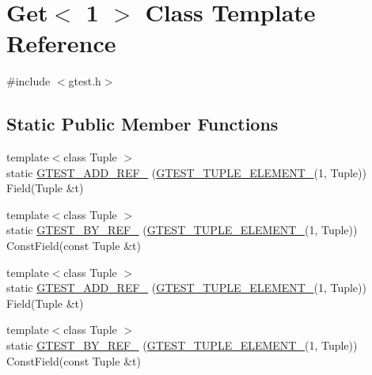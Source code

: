 \hypertarget{classstd_1_1tr1_1_1gtest__internal_1_1Get_3_011_01_4}{\section{\-Get$<$ 1 $>$ \-Class \-Template \-Reference}
\label{dd/d24/classstd_1_1tr1_1_1gtest__internal_1_1Get_3_011_01_4}
}


{\ttfamily \#include $<$gtest.\-h$>$}

\subsection*{\-Static \-Public \-Member \-Functions}
\begin{DoxyCompactItemize}
\item 
{\footnotesize template$<$class Tuple $>$ }\\static \hyperlink{classstd_1_1tr1_1_1gtest__internal_1_1Get_3_011_01_4_a3ad2995f1b852dbd9fde5033ddd07c09}{\-G\-T\-E\-S\-T\-\_\-\-A\-D\-D\-\_\-\-R\-E\-F\-\_\-} (\hyperlink{gtest-tuple_8h_a1b7f133d8aa02e0b7afed7b66781eeb7}{\-G\-T\-E\-S\-T\-\_\-\-T\-U\-P\-L\-E\-\_\-\-E\-L\-E\-M\-E\-N\-T\-\_\-}(1, \-Tuple)) \-Field(\-Tuple \&t)
\item 
{\footnotesize template$<$class Tuple $>$ }\\static \hyperlink{classstd_1_1tr1_1_1gtest__internal_1_1Get_3_011_01_4_abd6963f5ad67e11328215d67bb682d7c}{\-G\-T\-E\-S\-T\-\_\-\-B\-Y\-\_\-\-R\-E\-F\-\_\-} (\hyperlink{gtest-tuple_8h_a1b7f133d8aa02e0b7afed7b66781eeb7}{\-G\-T\-E\-S\-T\-\_\-\-T\-U\-P\-L\-E\-\_\-\-E\-L\-E\-M\-E\-N\-T\-\_\-}(1, \-Tuple)) \-Const\-Field(const \-Tuple \&t)
\item 
{\footnotesize template$<$class Tuple $>$ }\\static \hyperlink{classstd_1_1tr1_1_1gtest__internal_1_1Get_3_011_01_4_a3ad2995f1b852dbd9fde5033ddd07c09}{\-G\-T\-E\-S\-T\-\_\-\-A\-D\-D\-\_\-\-R\-E\-F\-\_\-} (\hyperlink{gtest-tuple_8h_a1b7f133d8aa02e0b7afed7b66781eeb7}{\-G\-T\-E\-S\-T\-\_\-\-T\-U\-P\-L\-E\-\_\-\-E\-L\-E\-M\-E\-N\-T\-\_\-}(1, \-Tuple)) \-Field(\-Tuple \&t)
\item 
{\footnotesize template$<$class Tuple $>$ }\\static \hyperlink{classstd_1_1tr1_1_1gtest__internal_1_1Get_3_011_01_4_abd6963f5ad67e11328215d67bb682d7c}{\-G\-T\-E\-S\-T\-\_\-\-B\-Y\-\_\-\-R\-E\-F\-\_\-} (\hyperlink{gtest-tuple_8h_a1b7f133d8aa02e0b7afed7b66781eeb7}{\-G\-T\-E\-S\-T\-\_\-\-T\-U\-P\-L\-E\-\_\-\-E\-L\-E\-M\-E\-N\-T\-\_\-}(1, \-Tuple)) \-Const\-Field(const \-Tuple \&t)
\end{DoxyCompactItemize}


